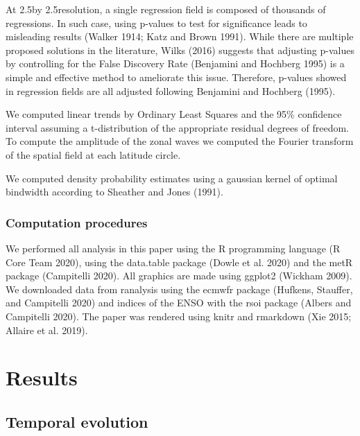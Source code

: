 \documentclass[smallextended]{svjour3}       %
\begin{document}
At 2.5\degree by 2.5\degree resolution, a single regression field is composed of thousands of regressions. In such case, using p-values to test for significance leads to misleading results (Walker 1914; Katz and Brown 1991). While there are multiple proposed solutions in the literature, Wilks (2016) suggests that adjusting p-values by controlling for the False Discovery Rate (Benjamini and Hochberg 1995) is a simple and effective method to ameliorate this issue. Therefore, p-values showed in regression fields are all adjusted following Benjamini and Hochberg (1995).

We computed linear trends by Ordinary Least Squares and the 95\% confidence interval assuming a t-distribution of the appropriate residual degrees of freedom. To compute the amplitude of the zonal waves we computed the Fourier transform of the spatial field at each latitude circle.

We computed density probability estimates using a gaussian kernel of optimal bindwidth according to Sheather and Jones (1991).

\hypertarget{computation-procedures}{%
\subsubsection{Computation procedures}\label{computation-procedures}}

We performed all analysis in this paper using the R programming language (R Core Team 2020), using the data.table package (Dowle et al. 2020) and the metR package (Campitelli 2020). All graphics are made using ggplot2 (Wickham 2009). We downloaded data from ranalysis using the ecmwfr package (Hufkens, Stauffer, and Campitelli 2020) and indices of the ENSO with the rsoi package (Albers and Campitelli 2020). The paper was rendered using knitr and rmarkdown (Xie 2015; Allaire et al. 2019).

\hypertarget{results}{%
\section{Results}\label{results}}

\hypertarget{temporal}{%
\subsection{Temporal evolution}\label{temporal}}
\end{document}

